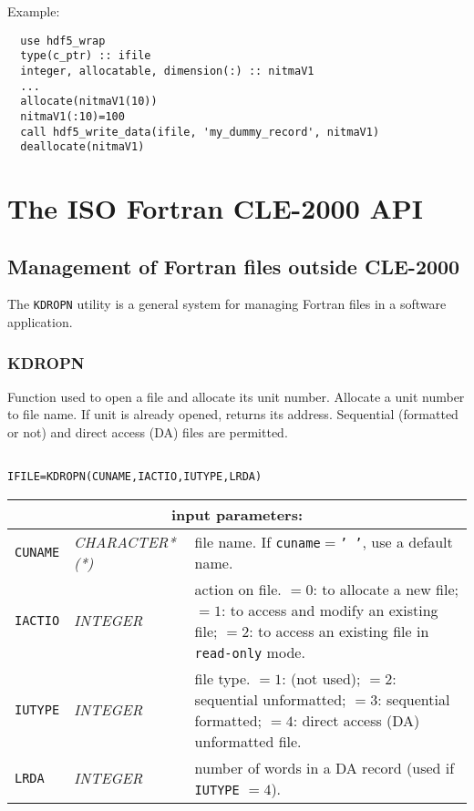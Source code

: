\vskip 0.4cm

\noindent Example:
\begin{verbatim}
  use hdf5_wrap
  type(c_ptr) :: ifile
  integer, allocatable, dimension(:) :: nitmaV1
  ...
  allocate(nitmaV1(10))
  nitmaV1(:10)=100
  call hdf5_write_data(ifile, 'my_dummy_record', nitmaV1)
  deallocate(nitmaV1)
\end{verbatim}

\clearpage

\section {The ISO Fortran CLE-2000 API}

\subsection {Management of Fortran files outside CLE-2000}

The {\tt KDROPN} utility is a general system for managing Fortran files in a software application.

\subsubsection{KDROPN}

Function used to open a file and allocate its unit number. Allocate a unit number to file
name. If unit is already opened, returns its address. Sequential (formatted
or not) and direct access (DA) files are permitted.

\begin{verbatim}

IFILE=KDROPN(CUNAME,IACTIO,IUTYPE,LRDA)
\end{verbatim}

\noindent
\begin{tabular}{|p{1.5cm}|p{3cm}|p{10cm}|}
\hline
\multicolumn{3}{|c|}{\bf input parameters:} \\
\hline
{\tt CUNAME} & {\it CHARACTER*(*)}  &  file name. If {\tt cuname}$=${\tt ' '}, use a default name. \\
\hline
{\tt IACTIO} & {\it INTEGER}  & action on file.
$=0$: to allocate a new file;
$=1$: to access and modify an existing file;
$=2$: to access an existing file in {\tt read-only} mode.  \\
\hline
{\tt IUTYPE} & {\it INTEGER}  & file type. 
$=1$:  (not used);
$=2$:  sequential unformatted;
$=3$:  sequential formatted;
$=4$:  direct access (DA) unformatted file.  \\
\hline
{\tt LRDA} & {\it INTEGER}  & number of words in a DA record (used if {\tt IUTYPE} $= 4$).  \\
\hline
\end{tabular}

